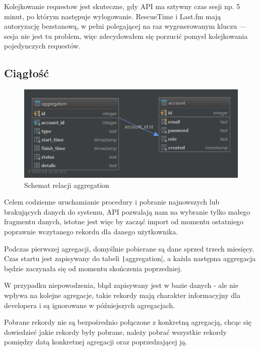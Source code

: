 \documentclass[openright]{xmgr}
\begin{document}
            Kolejkowanie requestow jest skuteczne, gdy API ma sztywny czas sesji np. 5 minut, po którym następuje wylogowanie.
            RescueTime i Last.fm mają autoryzację bezstanową,
            w pełni polegającej na raz wygenerowanym kluczu --- sesja nie jest tu problem,
            więc zdecydowałem się porzucić pomysł kolejkowania pojedynczych requestów.

        \subsection*{Ciągłość}

            \begin{figure}
                \centering
                \includegraphics[width=\textwidth]{fig/db-aggregation.png}
                \caption{Schemat relacji aggregation}
                \label{fig:db-aggregation}
            \end{figure}

            Celem codzienne uruchamianie procedury i pobranie najnowszych lub brakujących danych do systemu,
            API pozwalają nam na wybranie tylko małego fragmentu danych, istotne jest więc by zacząć import
            od momentu ostatniego poprawnie wczytanego rekordu dla danego użytkownika.

            Podczas pierwszej agregacji, domyślnie pobierane są dane sprzed trzech miesięcy.
            Czas startu jest zapisywany do tabeli \texttt|aggregation|,
            a każda następna aggregacja będzie zaczynała się od momentu skończenia poprzedniej.

            W przypadku niepowodzenia, błąd zapisywany jest w bazie danych - ale nie wpływa na kolejne agregacje,
            takie rekordy mają charakter informacyjny dla developera i są ignorowane w późniejszych agregacjach.

            Pobrane rekordy nie są bezpośrednio połączone z konkretną agregacją,
            chcąc się dowiedzieć jakie rekordy były pobrane, należy pobrać wszystkie rekordy pomiędzy datą konkretnej agregacji oraz poprzedzającej ją.
\end{document}
